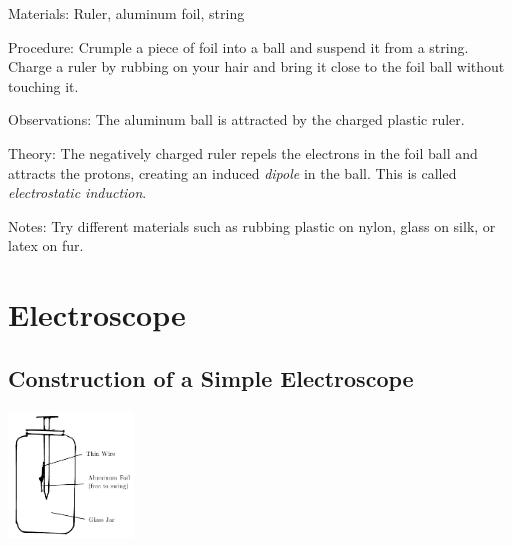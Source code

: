 \begin{multicols}{2}
\begin{description*}
\item[Materials:]{Ruler, aluminum foil, string}
\item[Procedure:]{Crumple a piece of foil into a ball and suspend it from a string. Charge a ruler by rubbing on your hair and bring it close to the foil ball without touching it.}
\item[Observations:]{The aluminum ball is attracted by the charged plastic ruler.}
\item[Theory:]{The negatively charged ruler repels the electrons in the foil ball and attracts the protons, creating an induced \emph{dipole} in the ball. This is called \emph{electrostatic induction}.}
\item[Notes:]{Try different materials such as rubbing plastic on nylon, glass on silk, or latex on fur.}
\end{description*}


\section*{Electroscope}

\subsection{Construction of a Simple Electroscope}

\begin{center}
\includegraphics[width=0.25\textwidth]{./img/al-leaf-electroscope.png}
\end{center}


\end{multicols}
